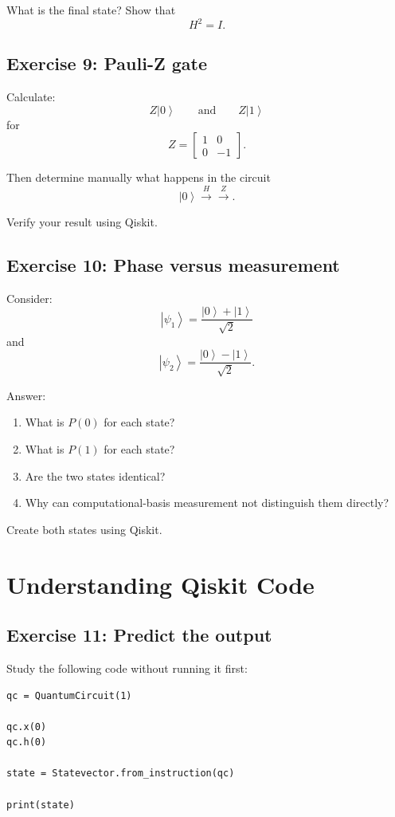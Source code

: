 \documentclass[12pt,a4paper]{article}
\newcommand{\ket}[1]{\left|#1\right\rangle}
\begin{document}
What is the final state? Show that
\[
H^2=I.
\]

\subsection*{Exercise 9: Pauli-Z gate}
Calculate:
\[
Z\ket{0}
\qquad\text{and}\qquad
Z\ket{1}
\]
for
\[
Z=
\begin{bmatrix}
1&0\\
0&-1
\end{bmatrix}.
\]

Then determine manually what happens in the circuit
\[
\ket{0}\xrightarrow{H}\xrightarrow{Z}.
\]

Verify your result using Qiskit.

\subsection*{Exercise 10: Phase versus measurement}
Consider:
\[
\ket{\psi_1}=
\frac{\ket{0}+\ket{1}}{\sqrt{2}}
\]
and
\[
\ket{\psi_2}=
\frac{\ket{0}-\ket{1}}{\sqrt{2}}.
\]

Answer:
\begin{enumerate}
    \item What is $P(0)$ for each state?
    \item What is $P(1)$ for each state?
    \item Are the two states identical?
    \item Why can computational-basis measurement not distinguish them directly?
\end{enumerate}

Create both states using Qiskit.

\section{Understanding Qiskit Code}

\subsection*{Exercise 11: Predict the output}
Study the following code without running it first:
\begin{lstlisting}
qc = QuantumCircuit(1)

qc.x(0)
qc.h(0)

state = Statevector.from_instruction(qc)

print(state)
\end{lstlisting}
\end{document}
